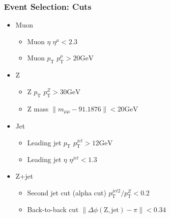 \begin{frame}
  \frametitle{Event Selection: Cuts}
   \begin{minipage}{0.8\linewidth}
   
    \begin{itemize}
      \item Muon
	\begin{itemize}
	  \item Muon $\eta$ \hfill $\eta^{\mu} < 2.3$
	  \item Muon $p_\mathrm{T}$ \hfill $p_\mathrm{T}^{\mu} > 20 \mathrm{ GeV}$
	\end{itemize}
      \item Z
	\begin{itemize}
	  \item Z $p_\mathrm{T}$ \hfill $p_\mathrm{T}^Z > 30 \mathrm{ GeV}$
	  \item Z mass \hfill $\|m_{\mu\mu} - 91.1876 \| < 20 \mathrm{ GeV}$
	\end{itemize}
      \item Jet
	\begin{itemize}
	  \item Leading jet $p_\mathrm{T}$ \hfill $p_\mathrm{T}^{jet} > 12 \mathrm{ GeV}$
	  \item Leading jet $\eta$ \hfill $\eta^{jet} < 1.3$
	\end{itemize}
      \item Z+jet
	\begin{itemize}
	  \item Second jet cut (alpha cut) \hfill $p_\mathrm{T}^{jet 2} / p_\mathrm{T}^{Z} < 0.2$
	  \item Back-to-back cut \hfill $\| \Delta\phi (\mathrm{Z, jet}) - \pi \| < 0.34$
	\end{itemize}
      

    \end{itemize}

   \end{minipage}


\end{frame}